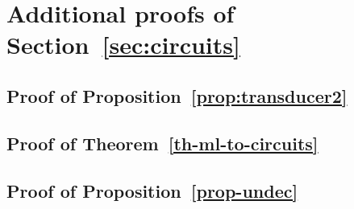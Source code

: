 \documentclass[acmsmall,review]{acmart}
\begin{document}

\newpage


\appendix

\section{Additional proofs of Section~\ref{sec:circuits}}
\subsection{Proof of Proposition~\ref{prop:transducer2}}

%


\subsection{Proof of Theorem~\ref{th-ml-to-circuits}}



\subsection{Proof of Proposition~\ref{prop-undec}}

\end{document}
